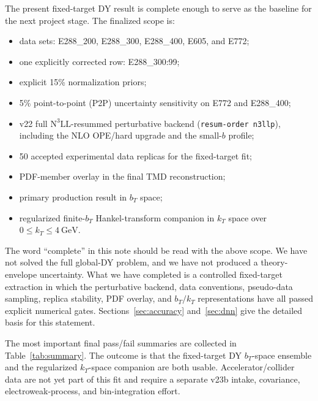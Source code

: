 \documentclass[11pt]{article}
\newcommand{\bt}{b_T}
\newcommand{\kt}{k_T}
\newcommand{\GeV}{\mathrm{GeV}}
\newcommand{\NthreeLL}{\mathrm{N^{3}LL}}
\newcommand{\code}[1]{\texttt{#1}}
\begin{document}
The present fixed-target DY result is complete enough to serve as the baseline for the next project stage.  The finalized scope is:
\begin{itemize}
  \item data sets: E288\_200, E288\_300, E288\_400, E605, and E772;
  \item one explicitly corrected row: E288\_300:99;
  \item explicit 15\% normalization priors;
  \item 5\% point-to-point (P2P) uncertainty sensitivity on E772 and E288\_400;
  \item v22 full $\NthreeLL$-resummed perturbative backend (\code{resum-order n3llp}), including the NLO OPE/hard upgrade and the small-$b$ profile;
  \item 50 accepted experimental data replicas for the fixed-target fit;
  \item PDF-member overlay in the final TMD reconstruction;
  \item primary production result in $\bt$ space;
  \item regularized finite-$\bt$ Hankel-transform companion in $\kt$ space over $0\le \kt\le 4~\GeV$.
\end{itemize}

The word ``complete'' in this note should be read with the above scope.  We have not solved the full global-DY problem, and we have not produced a theory-envelope uncertainty.  What we have completed is a controlled fixed-target extraction in which the perturbative backend, data conventions, pseudo-data sampling, replica stability, PDF overlay, and $\bt/\kt$ representations have all passed explicit numerical gates.  Sections~\ref{sec:accuracy} and~\ref{sec:dnn} give the detailed basis for this statement.

The most important final pass/fail summaries are collected in Table~\ref{tab:summary}.  The outcome is that the fixed-target DY $\bt$-space ensemble and the regularized $\kt$-space companion are both usable.  Accelerator/collider data are not yet part of this fit and require a separate v23b intake, covariance, electroweak-process, and bin-integration effort.
\end{document}
